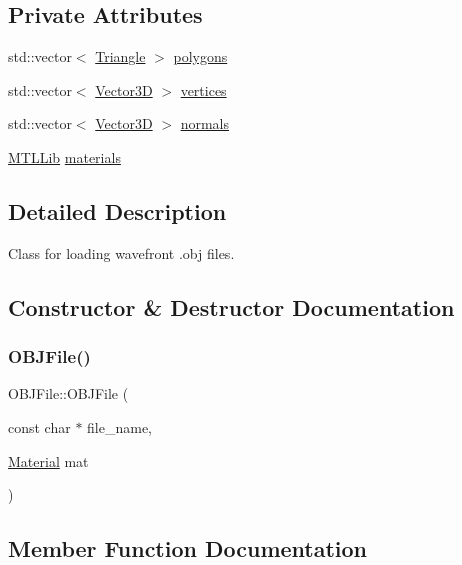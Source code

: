 \subsection*{Private Attributes}
\begin{DoxyCompactItemize}
\item 
std\+::vector$<$ \mbox{\hyperlink{classTriangle}{Triangle}} $>$ \mbox{\hyperlink{classOBJFile_a7d568b98c43fd96142d9f0f0e57b296e}{polygons}}
\item 
std\+::vector$<$ \mbox{\hyperlink{classVector3D}{Vector3D}} $>$ \mbox{\hyperlink{classOBJFile_a9b07010eef35e7d44250f5f4f8fa3428}{vertices}}
\item 
std\+::vector$<$ \mbox{\hyperlink{classVector3D}{Vector3D}} $>$ \mbox{\hyperlink{classOBJFile_a287bef6fc146d20df4585d103b226eec}{normals}}
\item 
\mbox{\hyperlink{classMTLLib}{M\+T\+L\+Lib}} \mbox{\hyperlink{classOBJFile_a5b08a58ba3f59a931eea6067e29f3e40}{materials}}
\end{DoxyCompactItemize}


\subsection{Detailed Description}
Class for loading wavefront .obj files. 

\subsection{Constructor \& Destructor Documentation}
\mbox{\label{classOBJFile_ac6c14cded889593868aaab4e7d3e4bfb}} 
\subsubsection{\texorpdfstring{OBJFile()}{OBJFile()}}
{\footnotesize\ttfamily O\+B\+J\+File\+::\+O\+B\+J\+File (\begin{DoxyParamCaption}\item[{const char $\ast$}]{file\+\_\+name,  }\item[{\mbox{\hyperlink{classMaterial}{Material}}}]{mat }\end{DoxyParamCaption})}



\subsection{Member Function Documentation}
\mbox{\label{classOBJFile_adb2b2bb5e0a2920a2886272a1c9ebdab}} 
